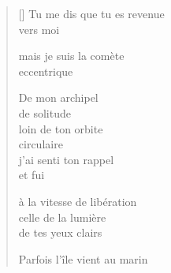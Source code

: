 \documentclass[11pt,a4paper]{article}
\begin{document}
\thispagestyle{empty}


\settowidth{\versewidth}{Parfois l'île vient au marin}

\bigskip

\begin{verse}[\versewidth]
  Tu me dis que tu es revenue \\
  vers moi

  mais je suis la comète \\
  eccentrique

  De mon archipel \\
  de solitude \\
  loin de ton orbite \\
  circulaire \\
  j'ai senti ton rappel \\
  et fui

  à la vitesse de libération \\
  celle de la lumière \\
  de tes yeux clairs

  Parfois l'île vient au marin
\end{verse}
\end{document}
